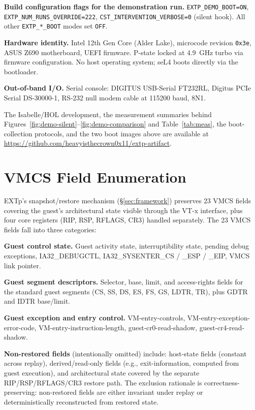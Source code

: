 \documentclass[conference]{IEEEtran}
\newcommand{\artifacturl}{https://github.com/heavyisthecrown0x11/extp-artifact}
\begin{document}
\textbf{Build configuration flags for the demonstration run.}
\texttt{EXTP\_DEMO\_BOOT=ON},
\texttt{EXTP\_NUM\_RUNS\_OVERRIDE=222},
\texttt{CST\_INTERVENTION\_VERBOSE=0} (silent hook).
All other \texttt{EXTP\_*\_BOOT} modes set \texttt{OFF}.

\textbf{Hardware identity.} Intel 12th Gen Core (Alder Lake),
microcode revision \texttt{0x3e}, ASUS Z690 motherboard, UEFI
firmware. P-state locked at 4.9~GHz turbo via firmware
configuration. No host operating system; seL4 boots directly via
the bootloader.

\textbf{Out-of-band I/O.} Serial console: DIGITUS USB-Serial
FT232RL, Digitus PCIe Serial DS-30000-1, RS-232 null modem cable
at 115200 baud, 8N1.

The Isabelle/HOL development, the measurement summaries behind
Figures~\ref{fig:demo-silent}--\ref{fig:demo-comparison} and
Table~\ref{tab:meas}, the boot-collection protocols, and the two
boot images above are available at \url{\artifacturl}.

\section{VMCS Field Enumeration}\label{app:vmcs}

EXTp's snapshot/restore mechanism (\S\ref{sec:framework})
preserves 23 VMCS fields covering the guest's architectural
state visible through the VT-x interface, plus four core
registers (RIP, RSP, RFLAGS, CR3) handled separately. The 23
VMCS fields fall into three categories:

\textbf{Guest control state.} Guest activity state,
interruptibility state, pending debug exceptions, IA32\_DEBUGCTL,
IA32\_SYSENTER\_CS / \_ESP / \_EIP, VMCS link pointer.

\textbf{Guest segment descriptors.} Selector, base, limit, and
access-rights fields for the standard guest segments
(CS, SS, DS, ES, FS, GS, LDTR, TR), plus GDTR and IDTR base/limit.

\textbf{Guest exception and entry control.} VM-entry-controls,
VM-entry-exception-error-code, VM-entry-instruction-length,
guest-cr0-read-shadow, guest-cr4-read-shadow.

\textbf{Non-restored fields} (intentionally omitted) include:
host-state fields (constant across replay), derived/read-only
fields (e.g., exit-information, computed from guest execution),
and architectural state covered by the separate RIP/RSP/RFLAGS/CR3
restore path. The exclusion rationale is correctness-preserving:
non-restored fields are either invariant under replay or
deterministically reconstructed from restored state.
\end{document}
